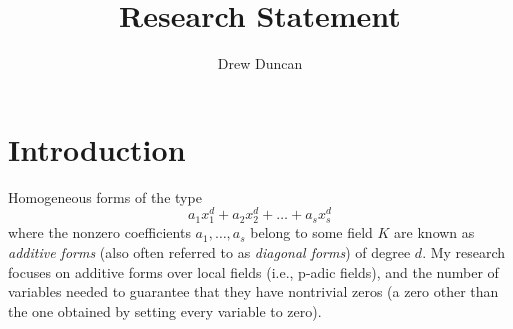 \documentclass{article}
\title{Research Statement}
\author{Drew Duncan}
\begin{document}
\maketitle












\section{Introduction}

Homogeneous forms of the type
\begin{equation}
\label{eq}
a_1x_1^d + a_2x_2^d + \ldots + a_sx_s^d
\end{equation} where the nonzero coefficients $a_1, \ldots, a_s$ belong to some field $K$ are known as \textit{additive forms} (also often referred to as \textit{diagonal forms}) of degree $d$.  My research focuses on additive forms over local fields (i.e., p-adic fields), and the number of variables needed to guarantee that they have nontrivial zeros (a zero other than the one obtained by setting every variable to zero).
\end{document}
